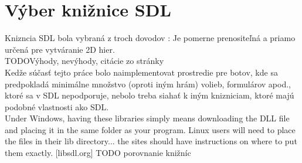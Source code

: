 \section {Výber knižnice SDL}
Knizncia SDL bola vybraná z troch dovodov : Je pomerne prenositeľná a priamo určená pre vytváranie 2D hier. \\
\huge TODO\normalsize {Výhody, nevýhody, citácie zo stránky} \\
Kedže súčasť tejto práce bolo naimplementovat prostredie pre botov, kde sa predpokladá minimálne množstvo (oproti iným hrám) volieb, formulárov apod., ktoré sa v SDL nepodporuje, nebolo treba siahať k iným knizniciam, ktoré majú podobné vlastnosti ako SDL. \\
Under Windows, having these libraries simply means downloading the DLL file and placing it in the same folder as your program. Linux users will need to place the files in their lib directory... the sites should have instructions on where to put them exactly. [libsdl.org]
\huge TODO \normalsize porovnanie knižníc
\newpage
